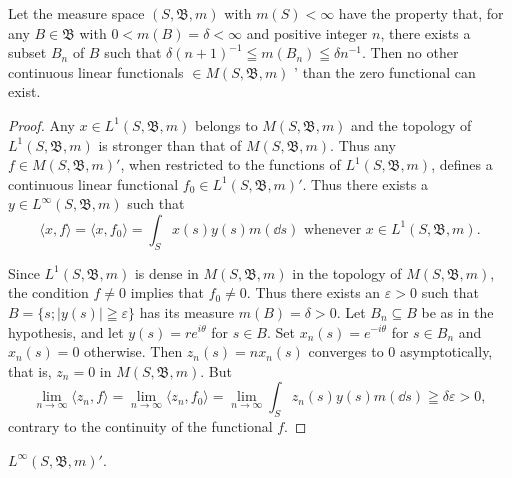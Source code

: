 \begin{example}\label{ex:IV.9.Example.4} Let the measure space $(S, \mathfrak{B}, m)$ with $m(S) < \infty$ have the property that, for any $B \in \mathfrak{B}$ with $0 < m(B) = \delta < \infty$ and positive integer $n$, there exists a subset $B_n$ of $B$ such that $\delta(n + 1)^{-1} \leqq m(B_n) \leqq \delta n^{-1}$. Then no other continuous linear functionals $\in M(S, \mathfrak{B}, m)$ ' than the zero functional can exist. 
\end{example}

\begin{proof}
 Any $x \in L^{1}(S, \mathfrak{B}, m)$ belongs to $M(S, \mathfrak{B}, m)$ and the topology of $L^{1}(S, \mathfrak{B}, m)$ is stronger than that of $M(S, \mathfrak{B}, m)$. Thus any $f \in M(S, \mathfrak{B}, m)'$, when restricted to the functions of $L^{1}(S, \mathfrak{B}, m)$, defines a continuous linear functional $f_{0} \in L^{1}(S, \mathfrak{B}, m)'$. Thus there exists a $y \in L^{\infty}(S, \mathfrak{B}, m)$ such that 
\[
\langle x, f \rangle = \langle x, f _{0} \rangle = \int_{S} x (s) y (s) m (\dd s) \text{ whenever } x \in L ^{1} (S, \mathfrak {B}, m). \]

Since $L^1(S, \mathfrak{B}, m)$ is dense in $M(S, \mathfrak{B}, m)$ in the topology of $M(S, \mathfrak{B}, m)$, the condition $f \neq 0$ implies that $f_0 \neq 0$. Thus there exists an $\varepsilon > 0$ such that $B = \{s; |y(s)| \geqq \varepsilon\}$ has its measure $m(B) = \delta > 0$. Let $B_n \subseteq B$ be as in the hypothesis, and let $y(s) = r e^{i\theta}$ for $s \in B$. Set $x_{n}(s) = e^{-i\theta}$ for $s \in B_{n}$ and $x_{n}(s) = 0$ otherwise. Then $z_{n}(s) = nx_{n}(s)$ converges to $0$ asymptotically, that is, \slim $z_{n} = 0$ in $M(S, \mathfrak{B}, m)$. But 
\[
\lim\limits _{n \rightarrow \infty} \langle z _{n}, f \rangle = \lim\limits _{n \rightarrow \infty} \langle z _{n}, f _{0} \rangle = \lim\limits _{n \rightarrow \infty} \int_{S} z _{n} (s) y (s) m (\dd s) \geqq \delta \varepsilon > 0,
\]
contrary to the continuity of the functional $f$. 
\end{proof}

\begin{example}\label{ex:IV.9.Example.5} $L^{\infty}(S, \mathfrak{B}, m)'$. 
\end{example}

